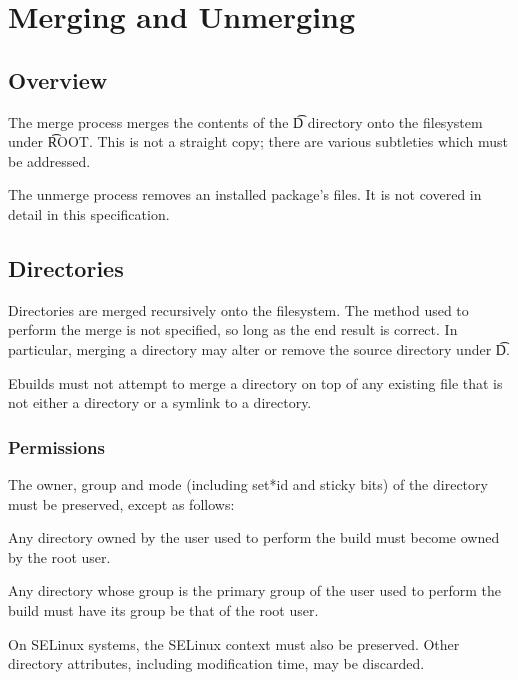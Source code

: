 \chapter{Merging and Unmerging}


\section{Overview}

The merge process merges the contents of the \t{D} directory onto the filesystem under \t{ROOT}\@.
This is not a straight copy; there are various subtleties which must be addressed.

The unmerge process removes an installed package's files. It is not covered in detail in this
specification.

\section{Directories}

Directories are merged recursively onto the filesystem. The method used to perform the merge is not
specified, so long as the end result is correct. In particular, merging a directory may alter or
remove the source directory under \t{D}.

Ebuilds must not attempt to merge a directory on top of any existing file that is not either a
directory or a symlink to a directory.

\subsection{Permissions}

The owner, group and mode (including set*id and sticky bits) of the directory must be preserved,
except as follows:

\begin{compactitem}
\item Any directory owned by the user used to perform the build must become owned by the root user.
\item Any directory whose group is the primary group of the user used to perform the build must have
    its group be that of the root user.
\end{compactitem}

On SELinux systems, the SELinux context must also be preserved. Other directory attributes, including
modification time, may be discarded.

